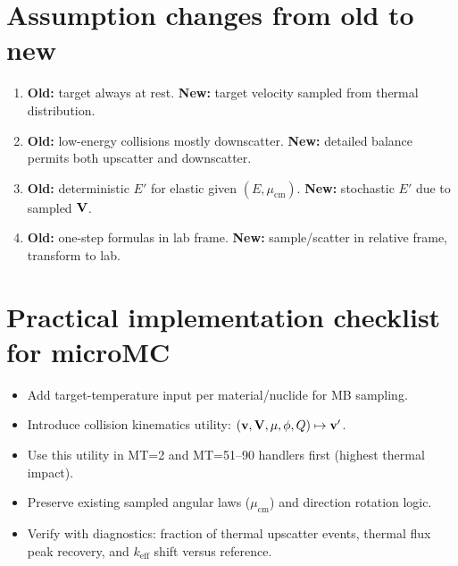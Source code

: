 \documentclass[11pt]{article}
\begin{document}
\section{Assumption changes from old to new}
\begin{enumerate}
  \item \textbf{Old:} target always at rest. \textbf{New:} target velocity sampled from thermal distribution.
  \item \textbf{Old:} low-energy collisions mostly downscatter. \textbf{New:} detailed balance permits both upscatter and downscatter.
  \item \textbf{Old:} deterministic $E'$ for elastic given $(E,\mu_{\text{cm}})$. \textbf{New:} stochastic $E'$ due to sampled $\vb{V}$.
  \item \textbf{Old:} one-step formulas in lab frame. \textbf{New:} sample/scatter in relative frame, transform to lab.
\end{enumerate}

\section{Practical implementation checklist for microMC}
\begin{itemize}
  \item Add target-temperature input per material/nuclide for MB sampling.
  \item Introduce collision kinematics utility: $(\vb{v},\vb{V},\mu,\phi,Q)\mapsto \vb{v}'$.
  \item Use this utility in MT=2 and MT=51--90 handlers first (highest thermal impact).
  \item Preserve existing sampled angular laws ($\mu_{\text{cm}}$) and direction rotation logic.
  \item Verify with diagnostics: fraction of thermal upscatter events, thermal flux peak recovery, and $k_{\text{eff}}$ shift versus reference.
\end{itemize}
\end{document}
